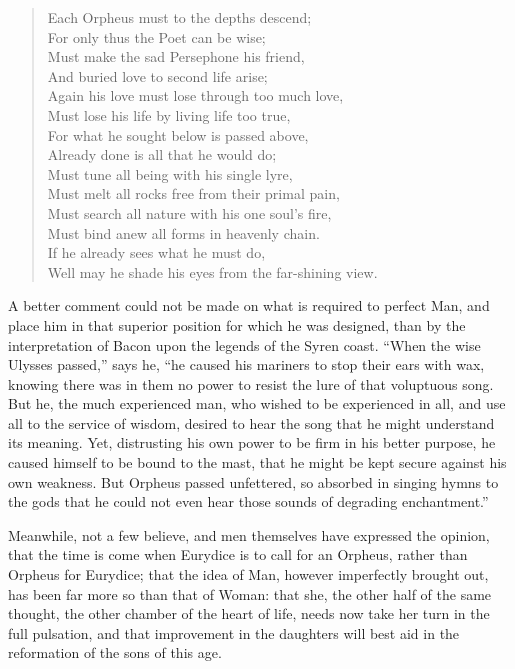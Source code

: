 \begin{verse}
Each Orpheus must to the depths descend;\\
\hspace{1.1em} For only thus the Poet can be wise;\\
Must make the sad Persephone his friend,\\
\hspace{1.1em} And buried love to second life arise;\\
Again his love must lose through too much love,\\
\hspace{1.1em} Must lose his life by living life too true,\\
For what he sought below is passed above,\\
\hspace{1.1em} Already done is all that he would do;\\
Must tune all being with his single lyre,\\
\hspace{1.1em} Must melt all rocks free from their primal pain,\\
Must search all nature with his one soul's fire,\\
\hspace{1.1em} Must bind anew all forms in heavenly chain.\\
If he already sees what he must do,\\
\hspace{1.1em} Well may he shade his eyes from the far-shining view.
\end{verse}

A better comment could not be made on what is required to perfect Man,
and place him in that superior position for which he was designed,
than by the interpretation of Bacon upon the legends of the Syren
coast. ``When the wise Ulysses passed,'' says he, ``he caused his
mariners to stop their ears with wax, knowing there was in them no
power to resist the lure of that voluptuous song. But he, the much
experienced man, who wished to be experienced in all, and use all to
the service of wisdom, desired to hear the song that he might
understand its meaning. Yet, distrusting his own power to be firm in
his better purpose, he caused himself to be bound to the mast, that he
might be kept secure against his own weakness. But Orpheus passed
unfettered, so absorbed in singing hymns to the gods that he could not
even hear those sounds of degrading enchantment.''

Meanwhile, not a few believe, and men themselves have expressed the
opinion, that the time is come when Eurydice is to call for an
Orpheus, rather than Orpheus for Eurydice; that the idea of Man,
however imperfectly brought out, has been far more so than that of
Woman:  that she, the other half of the same thought, the
other chamber of the heart of life, needs now take her turn in the
full pulsation, and that improvement in the daughters will best aid in
the reformation of the sons of this age.

